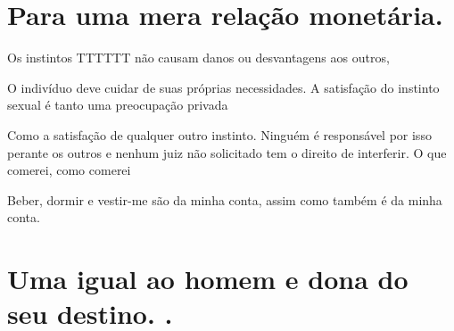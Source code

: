 \section{Para uma mera relação monetária.}
 \par 
Os instintos TTTTTT não causam danos ou desvantagens aos outros,
 \par 
O indivíduo deve cuidar de suas próprias necessidades. A satisfação do instinto sexual é tanto uma preocupação privada
 \par 
Como a satisfação de qualquer outro instinto. Ninguém é responsável por isso perante os outros e nenhum juiz não solicitado tem o direito de interferir. O que comerei, como comerei
 \par 
Beber, dormir e vestir-me são da minha conta, assim como também é da minha conta.
 \par 
\section{Uma igual ao homem e dona do seu destino. .}
 \par 
